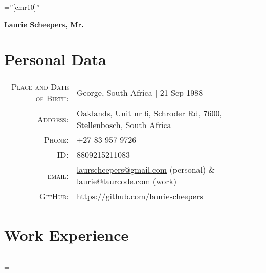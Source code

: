 \documentclass[a4paper,10pt,notitlepage]{article}
\newenvironment{absolutelynopagebreak}
  {\par\nobreak\vfil\penalty0\vfilneg
   \vtop\bgroup}
  {\par\xdef\tpd{\the\prevdepth}\egroup
   \prevdepth=\tpd}
\begin{document}
\pagestyle{empty} %

\font\fb=''[cmr10]'' %


\addtolength{\voffset}{-0.8cm} %

\begin{absolutelynopagebreak}
	
	\begin{center}
		\begin{center}
			\Huge\textbf{Laurie Scheepers, Mr.}
		\end{center}
	\end{center}
		
	\section{Personal Data}
	
	\begin{tabular}{rl}
		\textsc{Place and Date of Birth:} & George, South Africa  | 21 Sep 1988                                 \\
		\textsc{Address:}                 & Oaklands, Unit nr 6, Schroder Rd, 7600, Stellenbosch, South Africa \\
		\textsc{Phone:}                   & +27 83 957 9726                                                     \\
		\textsc{ID:}                      & 8809215211083                                                       \\
		\textsc{email:}                   & \href{mailto:laurscheepers@gmail.com}{laurscheepers@gmail.com} (personal) \& \href{mailto:laurie@laurcode.com}{laurie@laurcode.com} (work)      \\
		\textsc{GitHub:}                  & \href{https://github.com/lauriescheepers}{https://github.com/lauriescheepers}
	\end{tabular}
	
	
	\section{Work Experience}
	\begin{tabular}{r|p{11cm}}
		

\end{tabular}
\end{absolutelynopagebreak}
\end{document}
